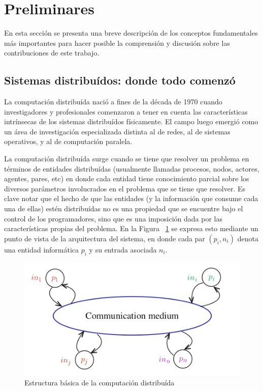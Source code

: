 \section{Preliminares}\label{sec:prelim}

En esta sección se presenta una breve descripción de los conceptos fundamentales
más importantes para hacer posible la comprensión y discusión sobre las
contribuciones de este trabajo.

\subsection{Sistemas distribuídos: donde todo comenzó}

La computación distribuída nació a fines de la década de 1970 cuando investigadores y profesionales
comenzaron a tener en cuenta las características intrínsecas de los sistemas distribuídos físicamente.
El campo luego emergió como un área de investigación especializada distinta al de redes, al de sistemas
operativos, y al de computación paralela.

La computación distribuída surge cuando se tiene que resolver un problema en términos de entidades
distribuídas (usualmente llamadas procesos, nodos, actores, agentes, pares, etc) en donde cada
entidad tiene conocimiento parcial sobre los diversos parámetros involucrados en el problema que
se tiene que resolver. 
Es clave notar que el hecho de que las entidades (y la información que consume cada una de ellas)
estén distribuídas no es una propiedad que se encuentre bajo el control de los programadores, sino 
que es una imposición dada por las características propias del problema. En la 
Figura ~\ref{fig:distributed-systems} se expresa esto mediante un punto de vista
de la arquitectura del sistema, en donde cada par $(p_i, n_i)$ denota una entidad informática $p_i$ y su
entrada asociada $n_i$.

\begin{figure}
  \centering
  \includegraphics[scale=0.5]{figures/distributed-systems.png}
  \caption{Estructura básica de la computación distribuída}
  \label{fig:distributed-systems}
\end{figure}


